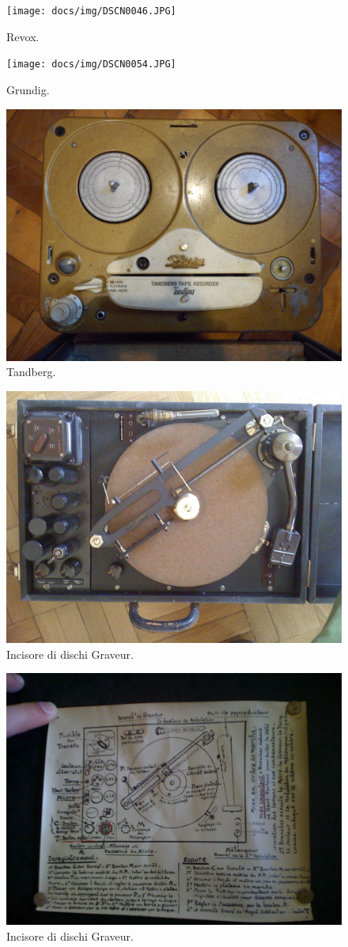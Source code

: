 \begin{figure}[H]
    \centering
    \texttt{[image: docs/img/DSCN0046.JPG]}
    \caption{Revox.}
\end{figure}

\begin{figure}[H]
    \centering
    \texttt{[image: docs/img/DSCN0054.JPG]}
    \caption{Grundig.}
\end{figure}

\begin{figure}[H]
    \centering
    \includegraphics[width=.8\textwidth]{docs/img/DSCN0060.JPG}
    \caption{Tandberg.}
\end{figure}

\begin{figure}[H]
    \centering
    \includegraphics[width=.8\textwidth]{docs/img/graveur-IMG_0877.JPG}
    \caption{Incisore di dischi Graveur.}
\end{figure}

\begin{figure}[H]
    \centering
    \includegraphics[width=.8\textwidth]{docs/img/graveur-IMG_0876.JPG}
    \caption{Incisore di dischi Graveur.}
\end{figure}

